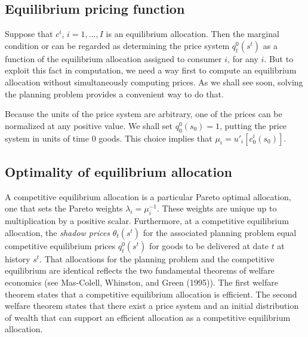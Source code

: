 \medskip








\subsection{Equilibrium pricing function}
  Suppose that $c^i$, $i=1, \ldots, I$  is an equilibrium allocation.
Then the   marginal condition  or  can be regarded as determining
the price system $q_t^0(s^t)$ as a function of the equilibrium allocation assigned
to consumer $i$, for any $i$. But to exploit this fact in computation, we need a way first to compute
an equilibrium allocation without simultaneously  computing prices.  As we shall see soon, solving the planning problem provides a convenient way
to do that.


  Because the units of the
price system are arbitrary, one of the prices
can be  normalized
at any positive value.  We shall set $q^0_0(s_0)= 1$,
putting the price system in units of time $0$
  goods. This choice implies that
 $\mu_i  =  u'_i[c_0^i(s_0)] $.



\subsection{Optimality of equilibrium allocation}
  A competitive  equilibrium allocation   is a particular Pareto
optimal allocation, one that sets the Pareto weights $\lambda_i =
\mu_i^{-1}$.  These weights are unique up to multiplication by a positive scalar. Furthermore, at a
competitive equilibrium allocation, the {\it shadow prices\/}
$\theta_t(s^t)$ for the associated planning problem equal  competitive equilibrium
prices $q_t^0(s^t)$ for goods to be delivered at date $t$
at  history $s^t$. %
 That  allocations for the planning
problem and the competitive equilibrium are identical reflects the
two fundamental theorems of welfare economics (see Mas-Colell,
Whinston, and Green (1995)).
The first welfare theorem states that a  competitive equilibrium allocation is efficient.
The second welfare theorem states that there exist a price system and  an initial distribution of wealth that can support an
  efficient allocation as a competitive equilibrium allocation.


